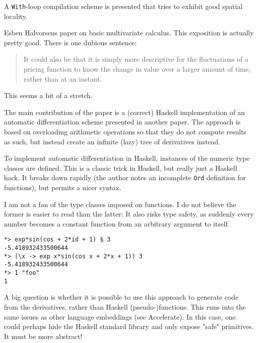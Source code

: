 \documentclass[a4paper, oneside, final]{memoir}
\begin{document}
A \texttt{With}-loop compilation scheme is presented that tries to
exhibit good spatial locality.

\begin{quote}
\end{quote}

Esben Halvorsens paper on basic multivariate calculus.  This
exposition is actually pretty good.  There is one dubious sentence:

\begin{quote}
  It could also be that it is simply more descriptive for the
  fluctuations of a pricing function to know the change in value over
  a larger amount of time, rather than at an instant.
\end{quote}

This seems a bit of a stretch.

The main contribution of the paper is a (correct) Haskell
implementation of an automatic differentiation scheme presented in
another paper.  The approach is based on overloading arithmetic
operations so that they do not compute results as such, but instead
create an infinite (lazy) tree of derivatives instead.

To implement automatic differentiation in Haskell, instances of the
numeric type classes are defined.  This is a classic trick in Haskell,
but really just a Haskell hack.  It breaks down rapidly (the author
notes an incomplete \texttt{Ord} definition for functions), but
permits a nicer syntax.

I am not a fan of the type classes imposed on functions.  I do not
believe the former is easier to read than the latter: It also risks
type safety, as suddenly every number becomes a constant function from
an arbitrary argument to itself.

\begin{verbatim}
*> exp*sin(cos + 2*id + 1) $ 3
-5.418932433500644
*> (\x -> exp x*sin(cos x + 2*x + 1)) 3
-5.418932433500644
*> 1 "foo"
1
\end{verbatim}

A big question is whether it is possible to use this approach to
generate code from the derivatives, rather than Haskell
(pseudo-)functions.  This runs into the same issues as other language
embeddings (see Accelerate).  In this case, one could perhaps hide the
Haskell standard library and only expose "safe" primitives.  It must
be more abstract!

\begin{quote}
\end{quote}
\end{document}
